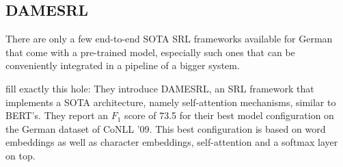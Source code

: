

\subsection{DAMESRL}

There are only a few end-to-end SOTA SRL frameworks available for German that come with a pre-trained model,
especially such ones that can be conveniently integrated in a pipeline of a bigger system.

\cite{do2018flexible} fill exactly this hole: They introduce DAMESRL, an SRL framework
that implements a SOTA architecture, namely self-attention mechanisms, similar to BERT's.
They report an $F_1$ score of 73.5 for their best model configuration on the German dataset
of CoNLL '09. This best configuration is based on word embeddings as well as character
embeddings, self-attention and a softmax layer on top.

